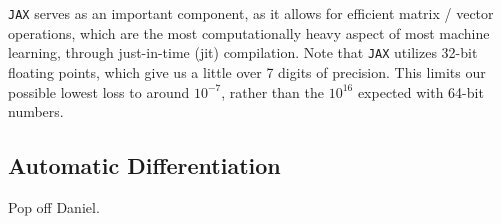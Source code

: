 \verb|JAX| serves as an important component, as it allows for efficient matrix / vector operations, which are the most computationally heavy aspect of most machine learning, through just-in-time (jit) compilation.
Note that \verb|JAX| utilizes 32-bit floating points, which give us a little over 7 digits of precision.
This limits our possible lowest loss to around $10^{-7}$, rather than the $10^{16}$ expected with 64-bit numbers.

\subsection{Automatic Differentiation}\label{sec:autodiff}
Pop off Daniel.
